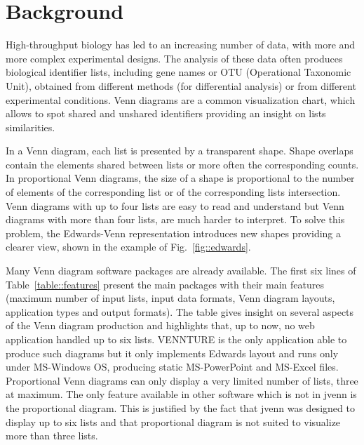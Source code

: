 \documentclass{bmcart}
\begin{document}


\section*{Background}

High-throughput biology has led to an increasing number of data, with more and 
more complex experimental designs. The analysis of these data often produces 
biological identifier lists, including gene names or OTU (Operational Taxonomic
Unit), obtained from different methods (for differential analysis) or from
different experimental conditions. Venn diagrams \cite{Venn1880} are a common
visualization chart, which allows to spot shared and unshared identifiers
providing an insight on lists similarities.

In a Venn diagram, each list is presented by a transparent shape. Shape overlaps
contain the elements shared between lists or more often the corresponding counts.
In proportional Venn diagrams, the size of a shape is proportional to the 
number of elements of the corresponding list or of the corresponding lists
intersection. Venn diagrams with up to four lists are easy to read and
understand but Venn diagrams with more than four lists, are much harder to
interpret. To solve this problem, the Edwards-Venn \cite{Edwards2004}
representation introduces new shapes providing a clearer view, shown in the 
example of Fig.~\ref{fig::edwards}.

Many Venn diagram software packages are already available. The first six lines
of Table~\ref{table::features} present the main packages with their 
main features (maximum number of input lists, input data formats, Venn diagram 
layouts, application types and output formats). The table gives insight on 
several aspects of the Venn diagram production and highlights that, up to now, 
no web application handled up to six lists. VENNTURE \cite{Bronwen2012} is the
only application able to produce such diagrams but it only implements Edwards
layout and runs only under MS-Windows OS, producing static MS-PowerPoint and
MS-Excel files. Proportional Venn diagrams can only display a very limited
number of lists, three at maximum. The only feature available in other software
which is not in jvenn is the proportional diagram. This is justified by the fact
that jvenn was designed to display up to six lists and that proportional diagram
is not suited to visualize more than three lists.
\end{document}
